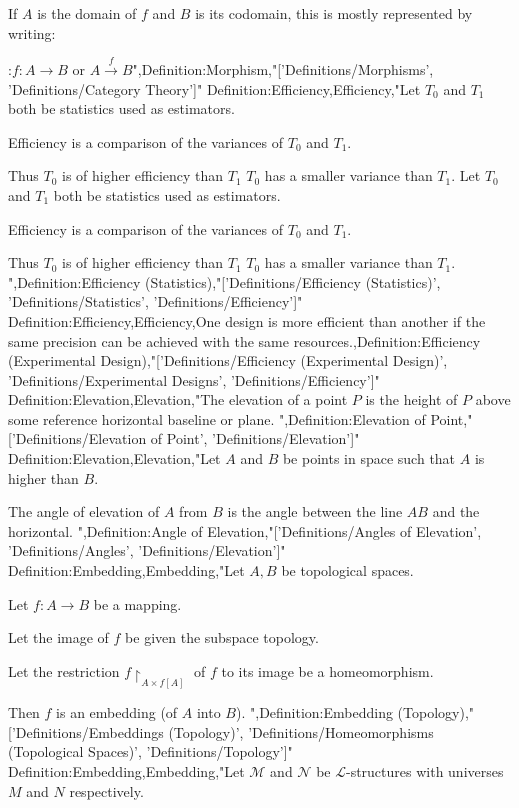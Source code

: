 If $A$ is the domain of $f$ and $B$ is its codomain, this is mostly represented by writing:

:$f: A \to B$ or $A \stackrel f \longrightarrow B$",Definition:Morphism,"['Definitions/Morphisms', 'Definitions/Category Theory']"
Definition:Efficiency,Efficiency,"Let $T_0$ and $T_1$ both be statistics used as estimators.

Efficiency is a comparison of the variances of $T_0$ and $T_1$.


Thus $T_0$ is of higher efficiency than $T_1$  $T_0$ has a smaller variance than $T_1$.
Let $T_0$ and $T_1$ both be statistics used as estimators.

Efficiency is a comparison of the variances of $T_0$ and $T_1$.


Thus $T_0$ is of higher efficiency than $T_1$  $T_0$ has a smaller variance than $T_1$.
",Definition:Efficiency (Statistics),"['Definitions/Efficiency (Statistics)', 'Definitions/Statistics', 'Definitions/Efficiency']"
Definition:Efficiency,Efficiency,One design is more efficient than another if the same precision can be achieved with the same resources.,Definition:Efficiency (Experimental Design),"['Definitions/Efficiency (Experimental Design)', 'Definitions/Experimental Designs', 'Definitions/Efficiency']"
Definition:Elevation,Elevation,"The elevation of a point $P$ is the height of $P$ above some reference horizontal baseline or plane.
",Definition:Elevation of Point,"['Definitions/Elevation of Point', 'Definitions/Elevation']"
Definition:Elevation,Elevation,"Let $A$ and $B$ be points in space such that $A$ is higher than $B$.

The angle of elevation of $A$ from $B$ is the angle between the line $AB$ and the horizontal.
",Definition:Angle of Elevation,"['Definitions/Angles of Elevation', 'Definitions/Angles', 'Definitions/Elevation']"
Definition:Embedding,Embedding,"Let $A, B$ be topological spaces.

Let $f: A \to B$ be a mapping.

Let the image of $f$ be given the subspace topology.

Let the restriction $f {\restriction_{A \times f\left[ A \right] }}$ of $f$ to its image be a homeomorphism.


Then $f$ is an embedding (of $A$ into $B$).
",Definition:Embedding (Topology),"['Definitions/Embeddings (Topology)', 'Definitions/Homeomorphisms (Topological Spaces)', 'Definitions/Topology']"
Definition:Embedding,Embedding,"Let $\mathcal M$ and $\mathcal N$ be $\mathcal L$-structures with universes $M$ and $N$ respectively.


